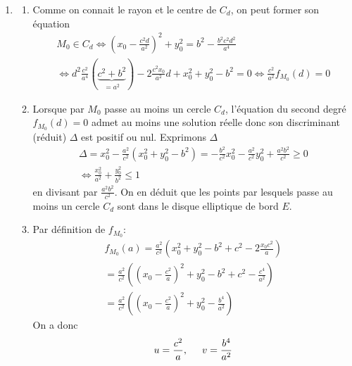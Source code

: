 \begin{enumerate}
\begin{enumerate}
\end{enumerate}

 \item
\begin{enumerate}
 \item Comme on connait le rayon et le centre de $C_d$, on peut former son équation 
\begin{multline*}
 M_0\in C_d \Leftrightarrow
(x_0-\frac{c^2d}{a^2})^2 +y_0^2 = b^2-\frac{b^2c^2d^2}{a^4}\\
\Leftrightarrow
d^2\frac{c^2}{a^4}(\underset{=a^2}{\underbrace{c^2+b^2}})-2\frac{c^2x_0}{a^2}d + x_0^2+y_0^2-b^2=0
\Leftrightarrow
\frac{c^2}{a^2}f_{M_0}(d)=0
\end{multline*}

 \item Lorsque par $M_0$ passe au moins un cercle $C_d$, l'équation du second degré $f_{M_0}(d)=0$ admet au moins une solution réelle donc son discriminant (réduit) $\Delta$ est positif ou nul. Exprimons $\Delta$
\begin{multline*}
 \Delta = x_0^2 -\frac{a^2}{c^2}(x_0^2+y_0^2-b^2)
=-\frac{b^2}{c^2}x_0^2-\frac{a^2}{c^2}y_0^2+\frac{a^2b^2}{c^2}\geq 0 \\
\Leftrightarrow
\frac{x_0^2}{a^2} + \frac{y_0^2}{b^2} \leq 1
\end{multline*}
 en divisant par $\frac{a^2b^2}{c^2}$. On en déduit que les points par lesquels passe au moins un cercle $C_d$ sont dans le disque elliptique de bord $E$.

\item Par définition de $f_{M_0}$:
\begin{multline*}
 f_{M_0}(a)=\frac{a^2}{c^2}\left(x_0^2+y_0^2-b^2+c^2-2\frac{x_0c^2}{a} \right)\\ 
= \frac{a^2}{c^2}\left((x_0-\frac{c^2}{a})^2 +y_0^2-b^2+c^2 -\frac{c^4}{a^2}\right) \\
= \frac{a^2}{c^2}\left((x_0-\frac{c^2}{a})^2 +y_0^2-\frac{b^4}{a^2}\right) 
\end{multline*}
On a donc
\begin{displaymath}
 u = \frac{c^2}{a},\hspace{0.5cm}v=\frac{b^4}{a^2}
\end{displaymath}


\end{enumerate}
\end{enumerate}
